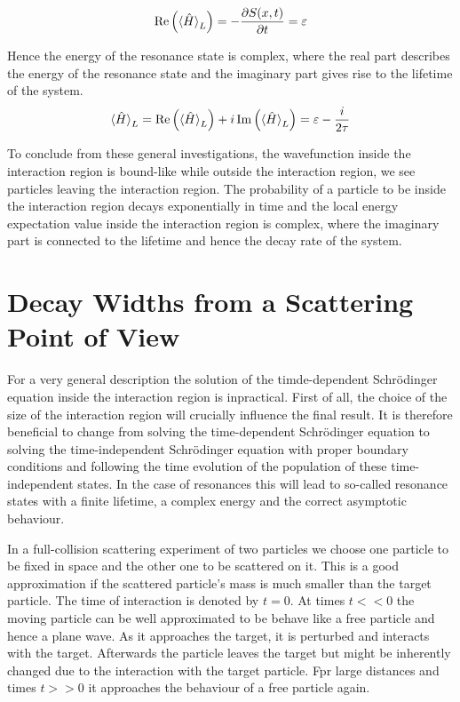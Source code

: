 \begin{equation}
  \operatorname{Re} \left( \braket{\hat{H}}_L \right)
  = -\frac{\partial S(x,t)}{\partial t}
  = \varepsilon
\end{equation}

Hence the energy of the resonance state is complex, where the real part
describes the energy of the resonance state and the imaginary part gives rise
to the lifetime of the system.
\begin{equation} \label{equation:expectation_H_interaction_region}
  \braket{\hat{H}}_L = \operatorname{Re} \left( \braket{\hat{H}}_L \right)
  + i \operatorname{Im} \left( \braket{\hat{H}}_L \right) = \varepsilon - \frac{i}{2\tau}
\end{equation}

To conclude from these general investigations, the wavefunction inside
the interaction region is bound-like while outside the interaction region,
we see particles leaving the interaction region. The probability of a
particle to be inside the interaction region decays exponentially in time
and the local energy expectation value inside the interaction region is complex,
where the imaginary part is connected to the lifetime and hence the decay
rate of the system.





\section{Decay Widths from a Scattering Point of View}
For a very general description the solution of the timde-dependent Schrödinger
equation inside the interaction region is inpractical. First of all, the
choice of the size of the interaction region will crucially influence the
final result. It is therefore beneficial to change from solving the time-dependent
Schrödinger equation to solving the time-independent Schrödinger equation
with proper boundary conditions and following the time evolution of the population
of these time-independent states. In the case of resonances
this will lead to so-called resonance states
with a finite lifetime, a complex energy and the correct asymptotic behaviour.

In a full-collision scattering experiment of two particles we choose
one particle to be fixed in space and the other one to be scattered on it.
This is a good approximation if the scattered particle's mass is much smaller
than the target particle. The time of interaction is denoted by $t=0$.
At times $t<<0$ the moving particle can be well approximated to be behave like
a free particle and hence a plane wave. As it approaches the target, it is
perturbed and interacts with the target. Afterwards the particle leaves the target
but might be inherently changed due to the interaction with the target particle.
Fpr large distances and times $t>>0$ it approaches the behaviour of a free
particle again.

